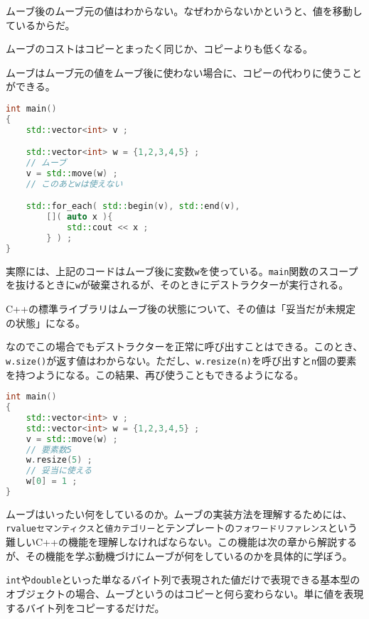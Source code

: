 ムーブ後のムーブ元の値はわからない。なぜわからないかというと、値を移動しているからだ。

ムーブのコストはコピーとまったく同じか、コピーよりも低くなる。

ムーブはムーブ元の値をムーブ後に使わない場合に、コピーの代わりに使うことができる。

\begin{lstlisting}[language={C++}]
int main()
{
    std::vector<int> v ;

    std::vector<int> w = {1,2,3,4,5} ;
    // ムーブ
    v = std::move(w) ;
    // このあとwは使えない

    std::for_each( std::begin(v), std::end(v), 
        []( auto x ){
            std::cout << x ;
        } ) ;
}
\end{lstlisting}

実際には、上記のコードはムーブ後に変数\texttt{w}を使っている。\texttt{main}関数のスコープを抜けるときに\texttt{w}が破棄されるが、そのときにデストラクターが実行される。

C++の標準ライブラリはムーブ後の状態について、その値は「妥当だが未規定の状態」になる。

なのでこの場合でもデストラクターを正常に呼び出すことはできる。このとき、\texttt{w.size()}が返す値はわからない。ただし、\texttt{w.resize(n)}を呼び出すと\texttt{n}個の要素を持つようになる。この結果、再び使うこともできるようになる。

\begin{lstlisting}[language={C++}]
int main()
{
    std::vector<int> v ;
    std::vector<int> w = {1,2,3,4,5} ;
    v = std::move(w) ;
    // 要素数5
    w.resize(5) ;
    // 妥当に使える
    w[0] = 1 ;
}
\end{lstlisting}


ムーブはいったい何をしているのか。ムーブの実装方法を理解するためには、\texttt{rvalueセマンティクス}と\texttt{値カテゴリー}とテンプレートの\texttt{フォワードリファレンス}という難しいC++の機能を理解しなければならない。この機能は次の章から解説するが、その機能を学ぶ動機づけにムーブが何をしているのかを具体的に学ぼう。

\texttt{int}や\texttt{double}といった単なるバイト列で表現された値だけで表現できる基本型のオブジェクトの場合、ムーブというのはコピーと何ら変わらない。単に値を表現するバイト列をコピーするだけだ。

